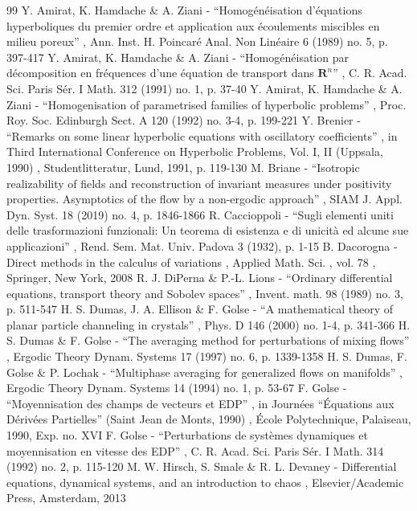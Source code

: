 \documentclass[11pt]{article}
\theoremstyle{plain}
\theoremstyle{definition}
\numberwithin{equation}{section}
\begin{document}
\begin{thebibliography}{99}
 Y. Amirat, K. Hamdache \& A. Ziani - “Homogénéisation d’équations hyperboliques du premier ordre et application aux écoulements miscibles en milieu poreux” , Ann. Inst. H. Poincaré Anal. Non Linéaire 6 (1989) no. 5, p. 397-417
 Y. Amirat, K. Hamdache \& A. Ziani - “Homogénéisation par décomposition en fréquences d’une équation de transport dans $\mathbf{R}^n$” , C. R. Acad. Sci. Paris Sér. I Math. 312 (1991) no. 1, p. 37-40
 Y. Amirat, K. Hamdache \& A. Ziani - “Homogenisation of parametrised families of hyperbolic problems” , Proc. Roy. Soc. Edinburgh Sect. A 120 (1992) no. 3-4, p. 199-221
 Y. Brenier - “Remarks on some linear hyperbolic equations with oscillatory coefficients” , in Third International Conference on Hyperbolic Problems, Vol. I, II (Uppsala, 1990) , Studentlitteratur, Lund, 1991, p. 119-130
 M. Briane - “Isotropic realizability of fields and reconstruction of invariant measures under positivity properties. Asymptotics of the flow by a non-ergodic approach” , SIAM J. Appl. Dyn. Syst. 18 (2019) no. 4, p. 1846-1866
 R. Caccioppoli - “Sugli elementi uniti delle trasformazioni funzionali: Un teorema di esistenza e di unicità ed alcune sue applicazioni” , Rend. Sem. Mat. Univ. Padova 3 (1932), p. 1-15
 B. Dacorogna - Direct methods in the calculus of variations , Applied Math. Sci. , vol. 78 , Springer, New York, 2008
 R. J. DiPerna \& P.-L. Lions - “Ordinary differential equations, transport theory and Sobolev spaces” , Invent. math. 98 (1989) no. 3, p. 511-547
 H. S. Dumas, J. A. Ellison \& F. Golse - “A mathematical theory of planar particle channeling in crystals” , Phys. D 146 (2000) no. 1-4, p. 341-366
 H. S. Dumas \& F. Golse - “The averaging method for perturbations of mixing flows” , Ergodic Theory Dynam. Systems 17 (1997) no. 6, p. 1339-1358
 H. S. Dumas, F. Golse \& P. Lochak - “Multiphase averaging for generalized flows on manifolds” , Ergodic Theory Dynam. Systems 14 (1994) no. 1, p. 53-67
 F. Golse - “Moyennisation des champs de vecteurs et EDP” , in Journées “Équations aux Dérivées Partielles” (Saint Jean de Monts, 1990) , École Polytechnique, Palaiseau, 1990, Exp. no. XVI
 F. Golse - “Perturbations de systèmes dynamiques et moyennisation en vitesse des EDP” , C. R. Acad. Sci. Paris Sér. I Math. 314 (1992) no. 2, p. 115-120
 M. W. Hirsch, S. Smale \& R. L. Devaney - Differential equations, dynamical systems, and an introduction to chaos , Elsevier/Academic Press, Amsterdam, 2013

\end{thebibliography}
\end{document}
